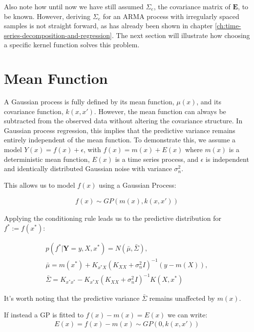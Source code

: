 Also note how until now we have still assumed $\Sigma_e$, the covariance matrix of $\mathbf{E}$, to be known.
However, deriving $\Sigma_e$ for an ARMA process with irregularly spaced samples is not straight forward, as has already
been shown in chapter \ref{ch:time-series-decomposition-and-regression}.
The next section will illustrate how choosing a specific kernel function solves this problem.

\section{Mean Function}\label{subsec:mean-function}

A Gaussian process is fully defined by its mean function, $\mu(x)$,
and its covariance function, $k(x, x')$. However, the mean function can always be subtracted from
the observed data without altering the covariance structure. In Gaussian process regression,
this implies that the predictive variance remains entirely independent of the mean function.
To demonstrate this, we assume a model $Y(x) = f(x) + \epsilon$,
with $f(x) = m(x) + E(x)$ where $m(x)$ is a deterministic mean function, $E(x)$ is a time series
process, and $\epsilon$ is independent and identically distributed Gaussian noise with variance $\sigma_n^{2}$.

This allows us to model $f(x)$ using a Gaussian Process:

\begin{gather*}
    f(x) \sim GP(m(x), k(x,x'))
\end{gather*}

Applying the conditioning rule leads us to the predictive distribution for $f^{\ast} := f(x^{\ast})$:

\begin{gather*}
    p(f^{\ast}| \mathbf{Y}= y, X, x^{\ast}) = N(\bar{\mu}, \bar{\Sigma}), \\
    \bar{\mu} = m(x^{\ast}) + K_{x^{\ast}X} (K_{XX} + \sigma_{n}^2 I )^{-1}(y - m(X)),\\
    \bar{\Sigma} = K_{x^{\ast}x^{\ast}} - K_{x^{\ast}X} (K_{XX} +  \sigma_{n}^2 I )^{-1} K(X, x^{\ast})
\end{gather*}

It's worth noting that the predictive variance $\bar{\Sigma}$ remains unaffected by $m(x)$.

If instead a GP is fitted to $f(x) - m(x) = E(x)$ we can write:
\begin{gather*}
    E(x) = f(x) - m(x) \sim GP(0, k(x,x'))
\end{gather*}

